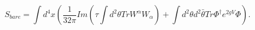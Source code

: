 \begin{equation}
S_{bare}=\int d^4 x \left( \frac{1}{32\pi}Im\left( \tau \int d^2 \theta Tr W^{\alpha}W_{\alpha}\right)
+\int d^2 \theta d^2 \bar{\theta} Tr \Phi^{\dagger} e^{2gV} \Phi\right).
\end{equation}

